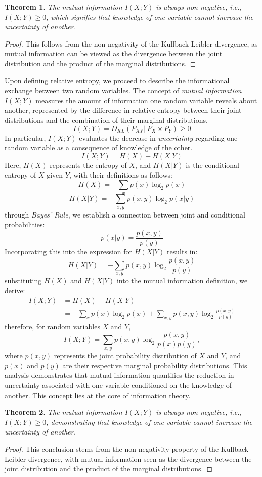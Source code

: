 \documentclass[journal,12pt,onecolumn,draftclsnofoot,]{IEEEtran}
\newtheorem{theorem}{Theorem}
\begin{document}
	\begin{theorem}
		The mutual information \(I(X; Y)\) is always non-negative, i.e., \(I(X; Y) \geq 0\), which signifies that knowledge of one variable cannot increase the uncertainty of another.
	\end{theorem}
	\begin{proof}
		This follows from the non-negativity of the Kullback-Leibler divergence, as mutual information can be viewed as the divergence between the joint distribution and the product of the marginal distributions.
	\end{proof}
	
	Upon defining relative entropy, we proceed to describe the informational exchange between two random variables. The concept of \emph{mutual information} \(I(X; Y)\) measures the amount of information one random variable reveals about another, represented by the difference in relative entropy between their joint distributions and the combination of their marginal distributions.
	\[I(X; Y) = D_{KL}(P_{XY} || P_{X} \times P_{Y}) \geq 0\]
	In particular, \(I(X; Y)\) evaluates the decrease in  \emph{uncertainty} regarding one random variable as a consequence of knowledge of the other.
	\[I(X; Y) = H(X) - H(X|Y)\]
	Here, \(H(X)\) represents the entropy of \(X\), and \(H(X|Y)\) is the conditional entropy of \(X\) given \(Y\), with their definitions as follows:
	\[H(X) = -\sum_{x} p(x) \log_2 p(x)\]
	\[H(X|Y) = -\sum_{x,y} p(x,y) \log_2 p(x|y)\]
	through \emph{Bayes' Rule}, we establish a connection between joint and conditional probabilities:
	\[p(x|y) = \frac{p(x,y)}{p(y)}\]
	Incorporating this into the expression for \(H(X|Y)\) results in:
	\[H(X|Y) = -\sum_{x,y} p(x,y) \log_2 \frac{p(x,y)}{p(y)}\]
	substituting \(H(X)\) and \(H(X|Y)\) into the mutual information definition, we derive:
	\[
	\begin{aligned}
		I(X; Y) &= H(X) - H(X|Y) \\
		&= -\sum_{x} p(x) \log_2 p(x) + \sum_{x,y} p(x,y) \log_2 \frac{p(x,y)}{p(y)} 
	\end{aligned}
	\]
	therefore, for random variables \(X\) and \(Y\),
	\begin{equation}
		I(X; Y) = \sum_{x,y} p(x,y) \log_2 \frac{p(x,y)}{p(x)p(y)},
	\end{equation}
	where \(p(x,y)\) represents the joint probability distribution of \(X\) and \(Y\), and \(p(x)\) and \(p(y)\) are their respective marginal probability distributions. This analysis demonstrates that mutual information quantifies the reduction in uncertainty associated with one variable conditioned on the knowledge of another. This concept lies at the core of information theory.
	\begin{theorem}
		The mutual information \(I(X; Y)\) is always non-negative, i.e., \(I(X; Y) \geq 0\), demonstrating that knowledge of one variable cannot increase the uncertainty of another.
	\end{theorem}
	\begin{proof}
		This conclusion stems from the non-negativity property of the Kullback-Leibler divergence, with mutual information seen as the divergence between the joint distribution and the product of the marginal distributions.
	\end{proof}
	
\end{document}
